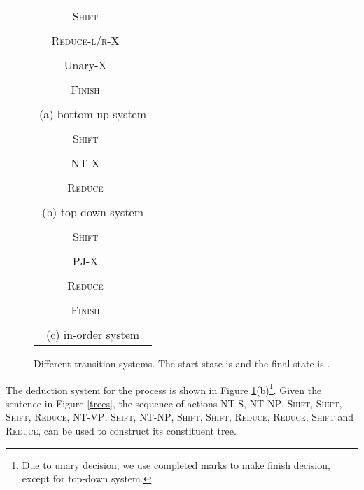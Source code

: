 \documentclass[11pt,letterpaper]{article}
\begin{document}
\begin{figure}[!tp]
\centering
\renewcommand{\arraystretch}{0.8}
\begin{tabular}{cc}
\multirow{2}{*}{\textsc{Shift}} &  \\
\cline{2-2}
& \\
\\
\multirow{2}{*}{\textsc{Reduce-l/r-X}} &  \\
\cline{2-2}
&\\
\\
\multirow{2}{*}{Unary-X} &  \\
\cline{2-2} 
&\\
\\
\multirow{2}{*}{\textsc{Finish}} &  \\
\cline{2-2}
&\\
\\
\multicolumn{2}{c}{(a) bottom-up system} \\
\\
\multirow{2}{*}{\textsc{Shift}} &  \\
\cline{2-2}
& \\
\\
\multirow{2}{*}{\textsc{NT-X}} &  \\
\cline{2-2}
&\\
\\
\multirow{2}{*}{\textsc{Reduce}} &  \\
\cline{2-2} 
&\\
\\
\multicolumn{2}{c}{(b) top-down system} \\
\\
\multirow{2}{*}{\textsc{Shift}} &  \\
\cline{2-2}
& \\
\\
\multirow{2}{*}{\textsc{PJ-X}} &  \\
\cline{2-2}
&\\
\\
\multirow{2}{*}{\textsc{Reduce}} &  \\
\cline{2-2} 
&\\
\\
\multirow{2}{*}{\textsc{Finish}} &  \\
\cline{2-2} 
&\\
\\
\multicolumn{2}{c}{(c) in-order system} \\
\end{tabular}
\caption{Different transition systems. The start state is  and the final state is .}
\label{deduction}
\end{figure}
The deduction system for the process is shown in Figure \ref{deduction}(b)\footnote{Due to unary decision, we use completed marks to make finish decision, except for top-down system.}.
Given the sentence in Figure \ref{trees}, the sequence of actions \textsc{NT-S}, \textsc{NT-NP}, \textsc{Shift}, \textsc{Shift}, \textsc{Shift}, \textsc{Reduce}, \textsc{NT-VP}, \textsc{Shift}, \textsc{NT-NP}, \textsc{Shift}, \textsc{Shift}, \textsc{Reduce}, \textsc{Reduce}, \textsc{Shift} and \textsc{Reduce}, can be used to construct its constituent tree.
\end{document}

